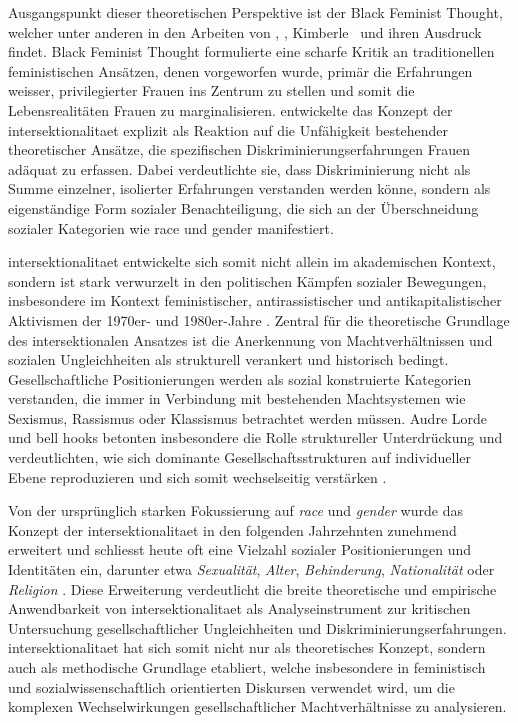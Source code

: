Ausgangspunkt dieser theoretischen Perspektive ist der Black Feminist Thought, welcher unter anderen in den Arbeiten von \textcite{hooksAintWomanBlack1981}, \textcite{lordeSisterOutsiderEssays1984}, Kimberle~\textcite{crenshawMappingMarginsIntersectionality1991} und \textcite{collinsBlackFeministThought2002} ihren Ausdruck findet. Black Feminist Thought formulierte eine scharfe Kritik an traditionellen feministischen Ansätzen, denen vorgeworfen wurde, primär die Erfahrungen weisser, privilegierter Frauen ins Zentrum zu stellen und somit die Lebensrealitäten \emph{} Frauen zu marginalisieren. \textcite{crenshawMappingMarginsIntersectionality1991} entwickelte das Konzept der \gls{intersektionalitaet} explizit als Reaktion auf die Unfähigkeit bestehender theoretischer Ansätze, die spezifischen Diskriminierungserfahrungen \emph{} Frauen adäquat zu erfassen. Dabei verdeutlichte sie, dass Diskriminierung nicht als Summe einzelner, isolierter Erfahrungen verstanden werden könne, sondern als eigenständige Form sozialer Benachteiligung, die sich an der Überschneidung sozialer Kategorien wie \gls{race} und \gls{gender} manifestiert.

\gls{intersektionalitaet} entwickelte sich somit nicht allein im akademischen Kontext, sondern ist stark verwurzelt in den politischen Kämpfen sozialer Bewegungen, insbesondere im Kontext feministischer, antirassistischer und antikapitalistischer Aktivismen der 1970er- und 1980er-Jahre \parencite{collinsBlackFeministThought2002}. Zentral für die theoretische Grundlage des intersektionalen Ansatzes ist die Anerkennung von Machtverhältnissen und sozialen Ungleichheiten als strukturell verankert und historisch bedingt. Gesellschaftliche Positionierungen werden als sozial konstruierte Kategorien verstanden, die immer in Verbindung mit bestehenden Machtsystemen wie Sexismus, Rassismus oder Klassismus betrachtet werden müssen. Audre Lorde und bell hooks betonten insbesondere die Rolle struktureller Unterdrückung und verdeutlichten, wie sich dominante Gesellschaftsstrukturen auf individueller Ebene reproduzieren und sich somit wechselseitig verstärken \parencite{collinsBlackFeministThought2002, hancockWhenMultiplicationDoesnt2007}.

Von der ursprünglich starken Fokussierung auf \textit{race} und \textit{gender} wurde das Konzept der \gls{intersektionalitaet} in den folgenden Jahrzehnten zunehmend erweitert und schliesst heute oft eine Vielzahl sozialer Positionierungen und Identitäten ein, darunter etwa \emph{Sexualität}, \emph{Alter}, \emph{Behinderung}, \emph{Nationalität} oder \emph{Religion} \parencite{bauerIntersectionalityQuantitativeResearch2021, bowlegInvitedReflectionQuantifying2016}. Diese Erweiterung verdeutlicht die breite theoretische und empirische Anwendbarkeit von \gls{intersektionalitaet} als Analyseinstrument zur kritischen Untersuchung gesellschaftlicher Ungleichheiten und Diskriminierungserfahrungen. \gls{intersektionalitaet} hat sich somit nicht nur als theoretisches Konzept, sondern auch als methodische Grundlage etabliert, welche insbesondere in feministisch und sozialwissenschaftlich orientierten Diskursen verwendet wird, um die komplexen Wechselwirkungen gesellschaftlicher Machtverhältnisse zu analysieren.

